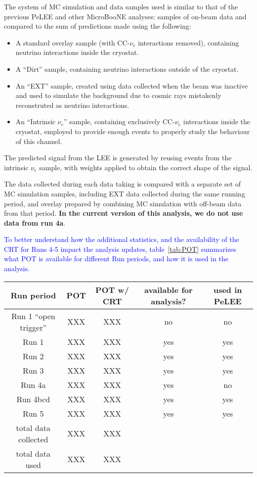 The system of MC simulation and data samples used is similar to that of the previous PeLEE and other MicroBooNE analyses: samples of on-beam data and compared to the sum of predictions made using the following:
%
\begin{itemize}
    \item A standard overlay sample (with CC-$\nu_e$ interactions removed), containing neutrino interactions inside the cryostat.
    \item A ``Dirt'' sample, containing neutrino interactions outside of the cryostat.
    \item An ``EXT'' sample, created using data collected when the beam was inactive and used to simulate the background due to cosmic rays mistakenly reconstruted as neutrino interactions.
    \item An ``Intrinsic $\nu_e$'' sample, containing exclusively CC-$\nu_e$ interactions inside the cryostat, employed to provide enough events to properly study the behaviour of this channel.
\end{itemize}
%
The predicted signal from the LEE is generated by reusing events from the intrinsic $\nu_e$ sample, with weights applied to obtain the correct shape of the signal. 

The data collected during each data taking is compared with a separate set of MC simulation samples, including EXT data collected during the same running period, and overlay prepared by combining MC simulation with off-beam data from that period. \textbf{In the current version of this analysis, we do not use data from run 4a}.

\textcolor{blue}{To better understand how the additional statistics, and the availability of the CRT for Runs 4-5 impact the analysis updates, table~\ref{tab:POT} summarizes what POT is available for different Run periods, and how it is used in the analysis.}

\begin{center}
\begin{tabular}{||c | c | c | c | c||} 
 \hline
 Run period & POT & POT w/ CRT & available for analysis? & used in PeLEE \\ [0.5ex] 
 \hline\hline
 Run 1 ``open trigger'' & XXX & XXX & no & no  \\ 
 \hline
  Run 1 & XXX & XXX & yes & yes \\ 
 \hline
   Run 2 & XXX & XXX & yes & yes \\ 
 \hline
   Run 3 & XXX & XXX & yes & yes \\ 
 \hline
   Run 4a & XXX & XXX & yes & no \\ 
 \hline
   Run 4bcd & XXX & XXX & yes & yes \\ 
 \hline
   Run 5 & XXX & XXX & yes & yes \\ 
 \hline\hline
   total data collected & XXX & XXX & & \\ 
 \hline
    total data used & XXX & XXX & & 
 \hline
 \label{tab:POT}
\end{tabular}
\end{center}
